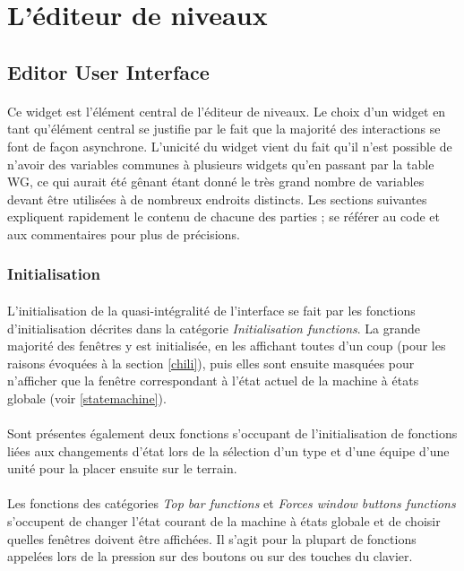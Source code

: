 \documentclass[a4paper]{article}
\begin{document}
\section{L'éditeur de niveaux}
\subsection{Editor User Interface}
\paragraph{}
Ce widget est l'élément central de l'éditeur de niveaux. Le choix d'un widget en tant qu'élément central se justifie par le fait que la majorité des interactions se font de façon asynchrone. L'unicité du widget vient du fait qu'il n'est possible de n'avoir des variables communes à plusieurs widgets qu'en passant par la table WG, ce qui aurait été gênant étant donné le très grand nombre de variables devant être utilisées à de nombreux endroits distincts. Les sections suivantes expliquent rapidement le contenu de chacune des parties ; se référer au code et aux commentaires pour plus de précisions.
\subsubsection{Initialisation}
\paragraph{}
L'initialisation de la quasi-intégralité de l'interface se fait par les fonctions d'initialisation décrites dans la catégorie \textit{Initialisation functions}. La grande majorité des fenêtres y est initialisée, en les affichant toutes d'un coup (pour les raisons évoquées à la section \ref{chili}), puis elles sont ensuite masquées pour n'afficher que la fenêtre correspondant à l'état actuel de la machine à états globale (voir \ref{statemachine}).
\paragraph{}
Sont présentes également deux fonctions s'occupant de l'initialisation de fonctions liées aux changements d'état lors de la sélection d'un type et d'une équipe d'une unité pour la placer ensuite sur le terrain.
\paragraph{}
Les fonctions des catégories \textit{Top bar functions} et \textit{Forces window buttons functions} s'occupent de changer l'état courant de la machine à états globale et de choisir quelles fenêtres doivent être affichées. Il s'agit pour la plupart de fonctions appelées lors de la pression sur des boutons ou sur des touches du clavier.
\end{document}
